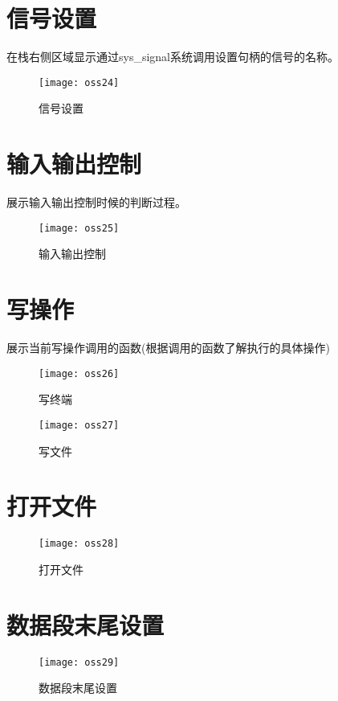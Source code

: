 \documentclass[]{report}
\begin{document}
\section{信号设置}
在栈右侧区域显示通过sys\_signal系统调用设置句柄的信号的名称。
\begin{figure}[H]%
	\centering  %
	\texttt{[image: oss24]}  
	\caption{信号设置} %
	\label{fig43}
\end{figure}
\section{输入输出控制}
展示输入输出控制时候的判断过程。
\begin{figure}[H]%
	\centering  %
	\texttt{[image: oss25]}  
	\caption{输入输出控制} %
	\label{fig44}
\end{figure}
\section{写操作}
展示当前写操作调用的函数(根据调用的函数了解执行的具体操作)
\begin{figure}[H]%
	\centering  %
	\texttt{[image: oss26]}  
	\caption{写终端} %
	\label{fig45}
\end{figure}
\begin{figure}[H]%
	\centering  %
	\texttt{[image: oss27]}  
	\caption{写文件} %
	\label{fig46}
\end{figure}
\section{打开文件}
\begin{figure}[H]%
	\centering  %
	\texttt{[image: oss28]}  
	\caption{打开文件} %
	\label{fig47}
\end{figure}
\section{数据段末尾设置}
\begin{figure}[H]%
	\centering  %
	\texttt{[image: oss29]}  
	\caption{数据段末尾设置} %
	\label{fig48}
\end{figure}
\end{document}

